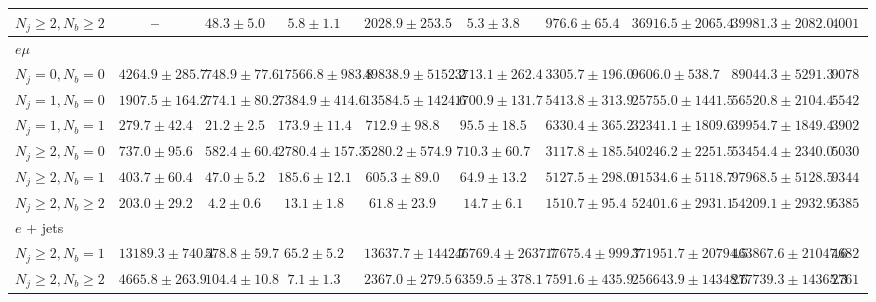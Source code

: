 \begin{sidewaystable}
{\begin{tabular}{l|ccccccc|cc}
        $N_{j} \geq 2, N_{b} \geq 2$       & --                   & $48.3 \pm 5.0$     & $5.8 \pm 1.1$      & $2028.9 \pm 253.5$     & $5.3 \pm 3.8$        & $976.6 \pm 65.4$     & $36916.5 \pm 2065.4$   & $39981.3 \pm 2082.0$   & $40011$  \\
        \hline
        \multicolumn{10}{l}{$e\mu$}         \\
        \hline
        $N_{j} = 0, N_{b} = 0$       & $4264.9 \pm 285.7$ & $748.9 \pm 77.6$ & $17566.8 \pm 983.8$ & $49838.9 \pm 5152.2$ & $3713.1 \pm 262.4$ & $3305.7 \pm 196.0$ & $9606.0 \pm 538.7$   & $89044.3 \pm 5291.3$ & $90784$  \\
        $N_{j} = 1, N_{b} = 0$       & $1907.5 \pm 164.2$ & $774.1 \pm 80.2$ & $7384.9 \pm 414.6$  & $13584.5 \pm 1424.6$ & $1700.9 \pm 131.7$ & $5413.8 \pm 313.9$ & $25755.0 \pm 1441.5$ & $56520.8 \pm 2104.4$ & $55427$  \\
        $N_{j} = 1, N_{b} = 1$       & $279.7 \pm 42.4$   & $21.2 \pm 2.5$   & $173.9 \pm 11.4$    & $712.9 \pm 98.8$     & $95.5 \pm 18.5$    & $6330.4 \pm 365.2$ & $32341.1 \pm 1809.6$ & $39954.7 \pm 1849.4$ & $39021$  \\
        $N_{j} \geq 2, N_{b} = 0$    & $737.0 \pm 95.6$   & $582.4 \pm 60.4$ & $2780.4 \pm 157.3$  & $5280.2 \pm 574.9$   & $710.3 \pm 60.7$   & $3117.8 \pm 185.5$ & $40246.2 \pm 2251.5$ & $53454.4 \pm 2340.0$ & $50301$  \\
        $N_{j} \geq 2, N_{b} = 1$    & $403.7 \pm 60.4$   & $47.0 \pm 5.2$   & $185.6 \pm 12.1$    & $605.3 \pm 89.0$     & $64.9 \pm 13.2$    & $5127.5 \pm 298.0$ & $91534.6 \pm 5118.7$ & $97968.5 \pm 5128.5$ & $93440$  \\
        $N_{j} \geq 2, N_{b} \geq 2$ & $203.0 \pm 29.2$   & $4.2 \pm 0.6$    & $13.1 \pm 1.8$      & $61.8 \pm 23.9$      & $14.7 \pm 6.1$     & $1510.7 \pm 95.4$  & $52401.6 \pm 2931.1$ & $54209.1 \pm 2932.9$ & $53859$  \\
        \hline
        \multicolumn{10}{l}{$e$ + jets}   \\
        \hline
        $N_{j} \geq 2, N_{b} = 1$          & $13189.3 \pm 740.4$  & $578.8 \pm 59.7$   & $65.2 \pm 5.2$     & $13637.7 \pm 1442.7$   & $46769.4 \pm 2637.7$ & $17675.4 \pm 999.7$  & $371951.7 \pm 20794.5$ & $463867.6 \pm 21047.6$ & $468222$ \\
        $N_{j} \geq 2, N_{b} \geq 2$       & $4665.8 \pm 263.9$   & $104.4 \pm 10.8$   & $7.1 \pm 1.3$      & $2367.0 \pm 279.5$     & $6359.5 \pm 378.1$   & $7591.6 \pm 435.9$   & $256643.9 \pm 14348.6$ & $277739.3 \pm 14365.3$ & $276116$ \\

\end{tabular}}
\end{sidewaystable}
